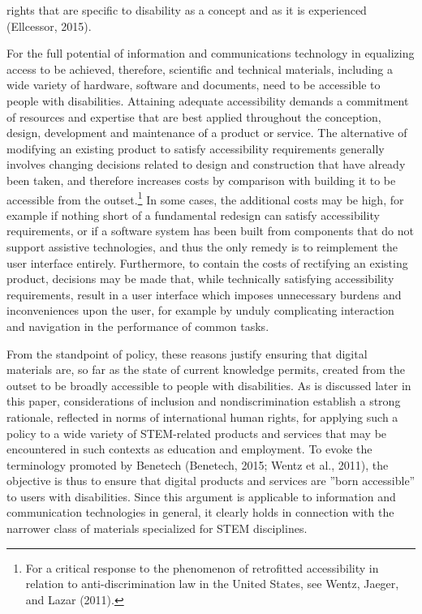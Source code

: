 \documentclass{sig-alternate} %
\begin{document}
\begin{large}
rights that are specific to disability as a concept and as it is experienced (Ellcessor, 2015).

For the full potential of information and communications technology in equalizing access to be achieved, therefore, scientific and technical materials, including a wide variety of hardware, software and documents, need to be accessible to people with disabilities. Attaining adequate accessibility demands a commitment of resources and expertise that are best applied throughout the conception, design, development and maintenance of a product or service. The alternative of modifying an existing product to satisfy accessibility requirements generally involves changing decisions related to design and construction that have already been taken, and therefore increases costs by comparison with building it to be accessible from the outset.\footnote{For a critical response to the phenomenon of retrofitted accessibility in relation to anti-discrimination law in the United States, see Wentz, Jaeger, and Lazar (2011).} In some cases, the additional costs may be high, for example if nothing short of a fundamental redesign can satisfy accessibility requirements, or if a software system has been built from components that do not support assistive technologies, and thus the only remedy is to reimplement the user interface entirely. Furthermore, to contain the costs of rectifying an existing product, decisions may be made that, while technically satisfying accessibility requirements, result in a user interface which imposes unnecessary burdens and inconveniences upon the user, for example by unduly complicating interaction and navigation in the performance of common tasks.

From the standpoint of policy, these reasons justify ensuring that digital materials are, so far as the state of current knowledge permits, created from the outset to be broadly accessible to people with disabilities. As is discussed later in this paper, considerations of inclusion and nondiscrimination establish a strong rationale, reflected in norms of international human rights, for applying such a policy to a wide variety of STEM-related products and services that may be encountered in such contexts as education and employment. To evoke the terminology promoted by Benetech (Benetech, 2015; Wentz et al., 2011), the objective is thus to ensure that digital products and services are ”born accessible” to users with disabilities. Since this argument is applicable to information and communication technologies in general, it clearly holds in connection with the narrower class of materials specialized for STEM disciplines.


\end{large}
\end{document}
